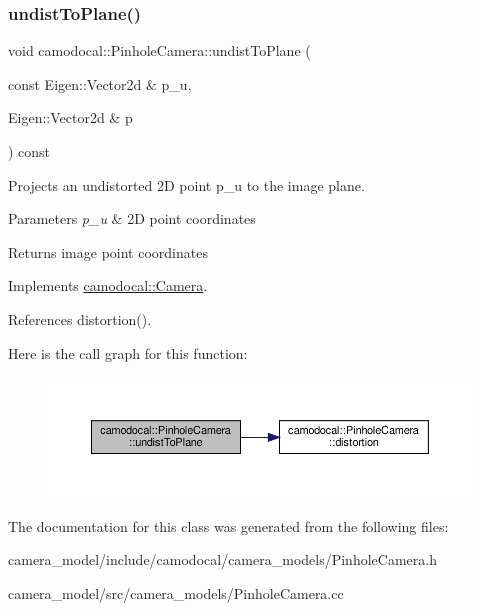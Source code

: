 \subsubsection{\texorpdfstring{undist\+To\+Plane()}{undistToPlane()}}
{\footnotesize\ttfamily void camodocal\+::\+Pinhole\+Camera\+::undist\+To\+Plane (\begin{DoxyParamCaption}\item[{const Eigen\+::\+Vector2d \&}]{p\+\_\+u,  }\item[{Eigen\+::\+Vector2d \&}]{p }\end{DoxyParamCaption}) const\hspace{0.3cm}{\ttfamily [virtual]}}



Projects an undistorted 2D point p\+\_\+u to the image plane. 


\begin{DoxyParams}{Parameters}
{\em p\+\_\+u} & 2D point coordinates \\
\hline
\end{DoxyParams}
\begin{DoxyReturn}{Returns}
image point coordinates 
\end{DoxyReturn}


Implements \hyperlink{classcamodocal_1_1Camera}{camodocal\+::\+Camera}.



References distortion().

Here is the call graph for this function\+:\nopagebreak
\begin{figure}[H]
\begin{center}
\leavevmode
\includegraphics[width=350pt]{classcamodocal_1_1PinholeCamera_a70cc5acd48df30c2f7a2f84b35369a39_cgraph}
\end{center}
\end{figure}


The documentation for this class was generated from the following files\+:\begin{DoxyCompactItemize}
\item 
camera\+\_\+model/include/camodocal/camera\+\_\+models/Pinhole\+Camera.\+h\item 
camera\+\_\+model/src/camera\+\_\+models/Pinhole\+Camera.\+cc\end{DoxyCompactItemize}
